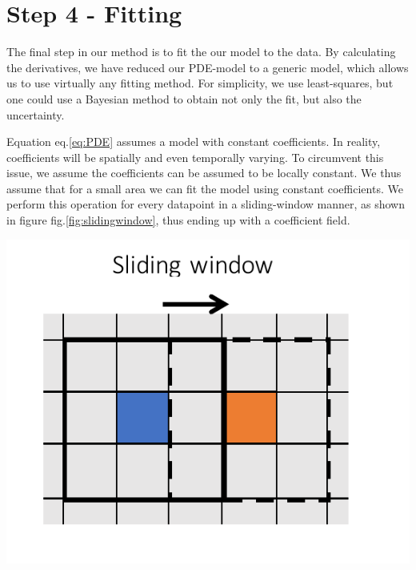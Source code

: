\documentclass{Dissertate}
\let\origfigure\figure
\let\endorigfigure\endfigure
\renewenvironment{figure}[1][2] {
    \expandafter\origfigure\expandafter[H]
} {
    \endorigfigure
}
\begin{document}
\hypertarget{step-4---fitting}{%
\section{Step 4 - Fitting}\label{step-4---fitting}}

The final step in our method is to fit the our model to the data. By
calculating the derivatives, we have reduced our PDE-model to a generic
model, which allows us to use virtually any fitting method. For
simplicity, we use least-squares, but one could use a Bayesian method to
obtain not only the fit, but also the uncertainty.

Equation eq.\ref{eq:PDE} assumes a model with constant coefficients. In
reality, coefficients will be spatially and even temporally varying. To
circumvent this issue, we assume the coefficients can be assumed to be
locally constant. We thus assume that for a small area we can fit the
model using constant coefficients. We perform this operation for every
datapoint in a sliding-window manner, as shown in figure
fig.\ref{fig:slidingwindow}, thus ending up with a coefficient field.

\begin{figure}
\hypertarget{fig:slidingwindow}{%
\centering
\includegraphics{source/figures/pdf/slidingwindow.pdf}
\caption{Schematic overview of the sliding window technique. The solid
black line encompasses an area around its blue coloured central pixel
and the fit output is assigned to that pixel. We then move the window
(dashed black line) and perform the fit for the orange coloured
pixel.}\label{fig:slidingwindow}
}
\end{figure}
\end{document}
